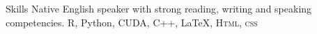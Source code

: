 
\begin{rubric}{Skills}
\entry*[Languages]
	Native English speaker with strong reading, writing and speaking competencies.
	R, Python, CUDA, C++, \LaTeX, \textsc{Html, css}

\end{rubric}
